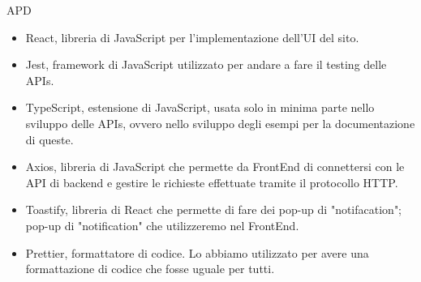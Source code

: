 \begin{listaPersonale} {APD}
\begin{itemize}
        \item React, libreria di JavaScript per l'implementazione dell'UI del sito.
        \item Jest, framework di JavaScript utilizzato per andare a fare il testing delle APIs.

        \item TypeScript, estensione di JavaScript, usata solo in minima parte nello sviluppo delle APIs, ovvero nello sviluppo degli esempi per la documentazione di queste.
        \item Axios, libreria di JavaScript che permette da FrontEnd di connettersi con le API di backend e gestire le richieste effettuate tramite il protocollo HTTP.
        \item Toastify, libreria di React che permette di fare dei pop-up di "notifacation"; pop-up di "notification" che utilizzeremo nel FrontEnd.
        \item Prettier, formattatore di codice. Lo abbiamo utilizzato per avere una formattazione di codice che fosse uguale per tutti.
    \end{itemize}

\end{listaPersonale}
